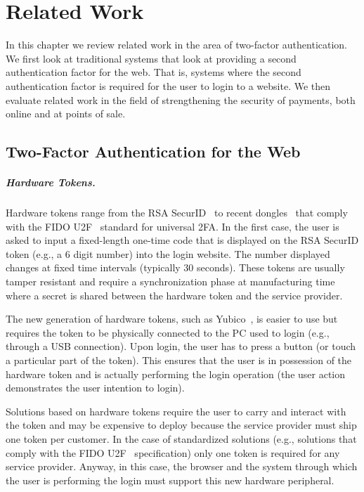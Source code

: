 \chapter{Related Work}
\label{chap:ps_relatedwork}

In this chapter we review related work in the area of two-factor authentication. We first look at traditional systems that look at providing a second authentication factor for the web. That is, systems where the second authentication factor is required for the user to login to a website. We then evaluate related work in the field of strengthening the security of payments, both online and at points of sale.

\section{Two-Factor Authentication for the Web}

\paragraph{Hardware Tokens.}
Hardware tokens range from the RSA SecurID~\cite{rsa} to recent dongles~\cite{yubico} that comply with the FIDO U2F~\cite{fido} standard for universal 2FA. In the first case, the user is asked to input a fixed-length one-time code that is displayed on the RSA SecurID token (e.g., a 6 digit number) into the login website. The number displayed changes at fixed time intervals (typically 30 seconds). These tokens are usually tamper resistant and require a synchronization phase at manufacturing time where a secret is shared between the hardware token and the service provider.

The new generation of hardware tokens, such as Yubico~\cite{yubico}, is easier to use but requires the token to be physically connected to the PC used to login (e.g., through a USB connection). Upon login, the user has to press a button (or touch a particular part of the token). This ensures that the user is in possession of the hardware token and is actually performing the login operation (the user action demonstrates the user intention to login).

Solutions based on hardware tokens require the user to carry and interact with the token and may be expensive to deploy because the service provider must ship one token per customer. In the case of standardized solutions (e.g., solutions that comply with the FIDO U2F~\cite{fido} specification) only one token is required for any service provider. Anyway, in this case, the browser and the system through which the user is performing the login must support this new hardware peripheral.

